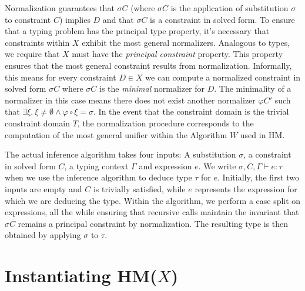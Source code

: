 \documentclass[runningheads]{llncs}
\newcommand{\hmx}{HM($X$)}
\begin{document}
Normalization
guarantees that $σC$ (where $σC$ is the application of substitution $σ$
to constraint $C$) implies $D$ and that $σC$ is a constraint in solved form.
To ensure that a typing problem has the principal type property, it's
necessary that constraints within $X$ exhibit the most general normalizers.
Analogous to types, we require that $X$ must have the
\emph{principal constraint} property.
This property ensures that the most general constraint results from
normalization.
Informally, this means for every constraint $D ∈ X$ we can compute a
normalized constraint in solved form $σC$ where $σC$ is the \emph{minimal}
normalizer for $D$. The minimality of a normalizer in this
case means there does not exist another normalizer $φC'$ such that $∃ξ. \ ξ ≠ ∅
  ∧ φ ∘ ξ = σ$.
In the event that the constraint domain is the trivial constraint domain
$Τ$, the normalization procedure corresponds to the computation of the
most general unifier within the Algorithm $W$ used in HM.

The actual inference algorithm takes four inputs: A substitution $σ$, a
constraint in solved form $C$, a typing context $Γ$ and expression $e$.
We write $σ, C, Γ ⊢ e : τ$ when we use the inference algorithm to deduce
type $τ$ for $e$.
Initially, the first two inputs are empty and $C$ is trivially satisfied, while
$e$ represents the expression for which we are deducing the type.
Within the algorithm, we perform a case split on expressions, all the
while ensuring that recursive calls maintain the invariant that $σC$
remains a principal constraint by normalization.
The resulting type is then obtained by applying $σ$ to $τ$.

\section{Instantiating \hmx{}}
\end{document}
